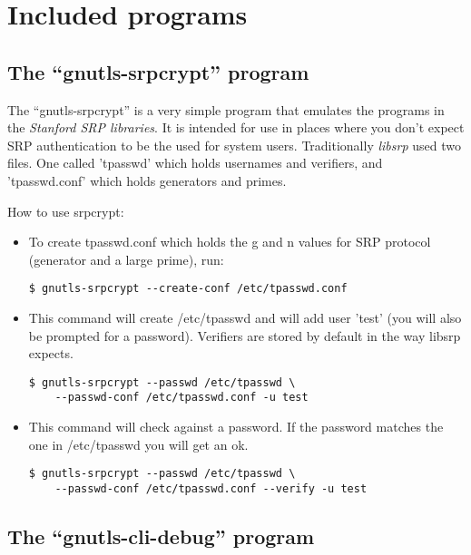 \chapter{Included programs}

\section{The ``gnutls-srpcrypt'' program}
\label{srpcrypt}

The ``gnutls-srpcrypt'' is a very simple program that emulates the programs in the 
\emph{Stanford SRP libraries}.
It is intended for use in places where you don't expect SRP
authentication to be the used for system users.
Traditionally \emph{libsrp} used two files. One called 'tpasswd' which holds usernames 
and verifiers, and 'tpasswd.conf' which holds generators and primes.
\par
How to use srpcrypt:

\begin{itemize}


\item To create tpasswd.conf which holds the g and n values for
SRP protocol (generator and a large prime), run:
\begin{verbatim}
$ gnutls-srpcrypt --create-conf /etc/tpasswd.conf
\end{verbatim}


\item This command will create /etc/tpasswd and will add user 'test' (you will also
be prompted for a password). Verifiers are stored by default in the
way libsrp expects.
\begin{verbatim}
$ gnutls-srpcrypt --passwd /etc/tpasswd \ 
    --passwd-conf /etc/tpasswd.conf -u test
\end{verbatim}

\item This command will check against a password. If the password matches 
the one in /etc/tpasswd you will get an ok.
\begin{verbatim}
$ gnutls-srpcrypt --passwd /etc/tpasswd \ 
    --passwd-conf /etc/tpasswd.conf --verify -u test
\end{verbatim}

\end{itemize}



\section{The ``gnutls-cli-debug'' program}

